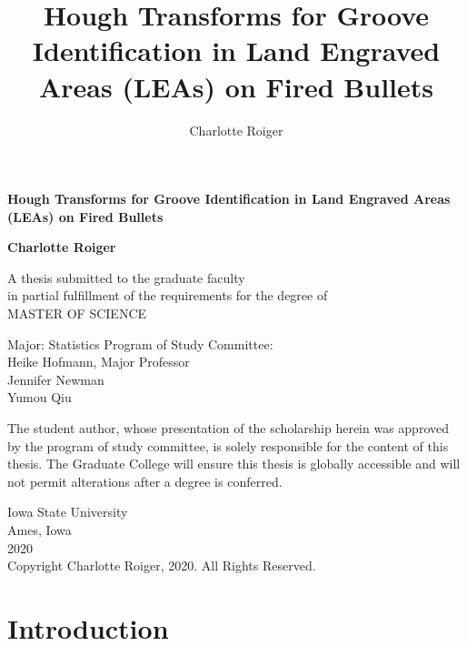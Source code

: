 \documentclass[12pt]{article}\usepackage[]{graphicx}\usepackage[]{color}
\author{Charlotte Roiger}
\title{Hough Transforms for Groove Identification in Land Engraved Areas (LEAs) on Fired Bullets}
\theoremstyle{nonumberplain}
\begin{document}
\lhead{\today}

\begin{titlepage}
   \begin{center}
       \vspace*{1cm}

       \textbf{Hough Transforms for Groove Identification in Land Engraved Areas (LEAs) on Fired Bullets}

            
       \vspace{1 cm}

       \textbf{Charlotte Roiger}

       \vskip 1in
            
       A thesis submitted to the graduate faculty \\
       in partial fulfillment of the requirements for the degree of\\
       MASTER OF SCIENCE
            
       \vspace{0.8cm}
       
       Major: Statistics
       \vspace{2cm}
       Program of Study Committee:\\
       Heike Hofmann, Major Professor \\
       Jennifer Newman \\
       Yumou Qiu
       
       \vspace{0.8cm}
       The student author, whose presentation of the scholarship herein was approved by the program
of study committee, is solely responsible for the content of this thesis. The Graduate College will
ensure this thesis is globally accessible and will not permit alterations after a degree is conferred.
     \vspace{3cm}
            
       Iowa State University\\
       Ames, Iowa\\
       2020\\
       Copyright \textcopyright Charlotte Roiger, 2020. All Rights Reserved.
            
   \end{center}
\end{titlepage}

\section{Introduction}
\end{document}
